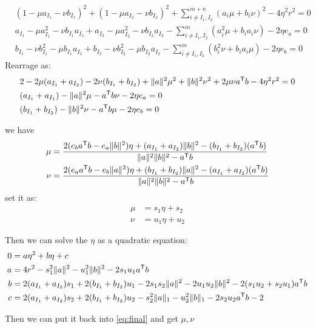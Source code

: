 \begin{equation}
\begin{split} 
  & (1-\mu a_{I_1}-\nu b_{I_1})^2 + (1-\mu a_{I_2}-\nu b_{I_2})^2 + \sum^{m+n}_{i\neq I_1,I_2}(a_i\mu+b_i\nu)^2 - 4\eta^2 r^2 = 0 \\
  & a_{I_1}-\mu a_{I_1}^2-\nu b_{I_1}a_{I_1} + a_{I_2}-\mu a_{I_2}^2-\nu b_{I_2}a_{I_2} - \sum^{m}_{i\neq I_1,I_2}(a_i^2\mu +b_i a_i\nu) - 2\eta {e_a} = 0 \\
  & b_{I_1}-\nu b_{I_1}^2-\mu b_{I_1}a_{I_1} + b_{I_2}-\nu b_{I_2}^2-\mu b_{I_2}a_{I_2} - \sum^{m}_{i\neq I_1,I_2}(b_i^2\nu +b_i a_i\mu) - 2\eta {e_b} = 0 
 \end{split}
\end{equation}
Rearrage as:
\begin{equation}
\begin{split} 
  & 2-2\mu (a_{I_1}+a_{I_2})-2\nu(b_{I_1}+b_{I_2})+  \|a\|^2\mu^2+\|b\|^2\nu^2+2\mu\nu a^{\mathsf T}b - 4\eta^2 r^2 = 0 \\
  & (a_{I_1}+ a_{I_1}) -  \|a\|^2\mu - a^{\mathsf T}b\nu - 2\eta {e_a} = 0 \\
  & (b_{I_1}+ b_{I_2}) - \|b\|^2\nu - a^{\mathsf T}b \mu - 2\eta {e_b} = 0 
 \end{split}
\end{equation}

we have 
\begin{equation}
\begin{split} 
\mu &= \frac{2( e_ba^{\mathsf T}b - e_a\|b\|^2  )\eta + (a_{I_1}+a_{I_2}) \|b\|^2 - (b_{I_1} + b_{I_2}) (a^{\mathsf T}b)}{ \|a\|^2 \|b\|^2 -a^{\mathsf T}b}\\
\nu  &=\frac{2( e_aa^{\mathsf T}b - e_b\|a\|^2  )\eta + (b_{I_1}+b_{I_2}) \|a\|^2 - (a_{I_1} + a_{I_2}) (a^{\mathsf T}b)}{ \|a\|^2 \|b\|^2 -a^{\mathsf T}b}\\
 \end{split}
\end{equation}
set it as:
\begin{equation}
\begin{split} 
\mu &= s_1 \eta + s_2\\ 
\nu  &= u_1 \eta + u_2
 \end{split}
 \label{eq:final}
\end{equation}

Then we can solve the $\eta$ as a quadratic equation:
\begin{equation}
\begin{split} 
0&=a\eta^2+b\eta+c\\
 a&= 4r^2 - s_1^2\|a\|^2 - u_1^2\|b\|^2 -2s_1 u_1a^{\mathsf T}b\\
b&=2(a_{I_1} + a_{I_2})s_1 +2(b_{I_1} + b_{I_2})u_1 - 2s_1s_2 \|a\|^2 - 2u_1u_2\|b\|^2 - 2(s_1u_2+s_2u_1)a^{\mathsf T}b  \\
 c&=2(a_{I_1} + a_{I_2})s_2 +2(b_{I_1} + b_{I_2})u_2 -s_2^2\|a\|_1 -u_2^2\|b\|_1 - 2s_2u_2a^{\mathsf T}b -2
 \end{split}
\end{equation}

Then we can put it back into \ref{eq:final} and get $\mu, \nu$
